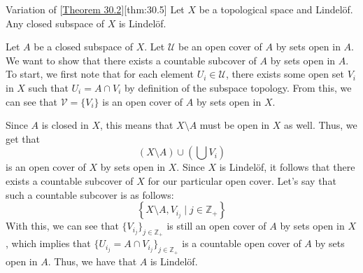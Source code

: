 \begin{thmBox}{Variation of [\hyperlink{thm:30.2}{Theorem 30.2}]}[thm:30.5]
    Let \( X \) be a topological space and Lindel\"{o}f.
    Any closed subspace of \( X \) is Lindel\"{o}f.

    \baseRule

    \begin{proofBox}
        Let \( A \) be a closed subspace of \( X \). 
        Let \( \mathcal{U} \) be an open cover of \( A \) by sets open in \( A \). 
        We want to show that there exists a countable subcover of \( A \) by sets 
        open in \( A \). 
        To start, we first note that for each element \( U_{ i } \in \mathcal{U} \),
        there exists some open set \( V_{ i } \) in \( X \) such that 
        \( U_{ i } = A \cap V_{ i } \) by definition of the subspace topology. 
        From this, we can see that \( \mathcal{V} = \{ V_{ i } \} \) is an open cover 
        of \( A \) by sets open in \( X \). 

        \baseSkip 

        Since \( A \) is closed in \( X \), this means that \( X \setminus A \) must be 
        open in \( X \) as well. 
        Thus, we get that 
        \begin{equation*}
            ( X \setminus A ) \cup \left( \bigcup V_{ i } \right)   
        \end{equation*}
        is an open cover of \( X \) by sets open in \( X \). 
        Since \( X \) is Lindel\"{o}f, it follows that there exists a countable subcover
        of \( X \) for our particular open cover. 
        Let's say that such a countable subcover is as follows: 
        \begin{equation*}
            \left\{ X \setminus A, V_{ i_{ j } } \mid j \in \mathbb{Z}_{ + } \right\}
        \end{equation*}
        With this, we can see that \( \{ V_{ i_{ j } } \}_{ j \in \mathbb{Z}_{ + } } \)
        is still an open cover of \( A \) by sets open in \( X \), which implies that 
        \( \{ U_{ i_{ j } } = A \cap V_{ i_{ j } } \}_{ j \in \mathbb{Z}_{ + } } \)
        is a countable open cover of \( A \) by sets open in \( A \).
        Thus, we have that \( A \) is Lindel\"{o}f.
    \end{proofBox}
\end{thmBox}